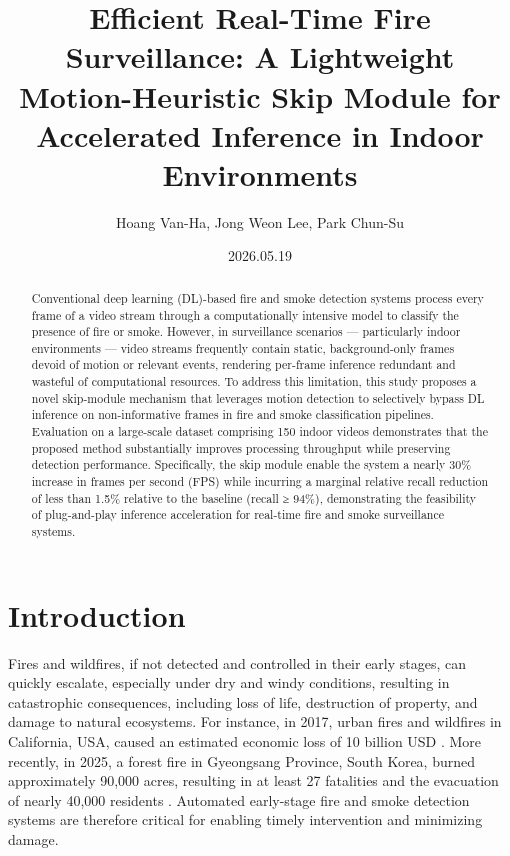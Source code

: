 \documentclass[
  10pt,
]{article}
\title{Efficient Real-Time Fire Surveillance: A Lightweight
Motion-Heuristic Skip Module for Accelerated Inference in Indoor
Environments}
\author{Hoang Van-Ha, Jong Weon Lee, Park Chun-Su}
\date{2026.05.19}
\begin{document}
\maketitle
\begin{abstract}
Conventional deep learning (DL)-based fire and smoke detection systems
process every frame of a video stream through a computationally
intensive model to classify the presence of fire or smoke. However, in
surveillance scenarios --- particularly indoor environments --- video
streams frequently contain static, background-only frames devoid of
motion or relevant events, rendering per-frame inference redundant and
wasteful of computational resources. To address this limitation, this
study proposes a novel skip-module mechanism that leverages motion
detection to selectively bypass DL inference on non-informative frames
in fire and smoke classification pipelines. Evaluation on a large-scale
dataset comprising 150 indoor videos demonstrates that the proposed
method substantially improves processing throughput while preserving
detection performance. Specifically, the skip module enable the system a
nearly 30\% increase in frames per second (FPS) while incurring a
marginal relative recall reduction of less than 1.5\% relative to the
baseline (recall ≥ 94\%), demonstrating the feasibility of plug-and-play
inference acceleration for real-time fire and smoke surveillance
systems.
\end{abstract}

\section{Introduction}\label{sec:introduction}

Fires and wildfires, if not detected and controlled in their early
stages, can quickly escalate, especially under dry and windy conditions,
resulting in catastrophic consequences, including loss of life,
destruction of property, and damage to natural ecosystems. For instance,
in 2017, urban fires and wildfires in California, USA, caused an
estimated economic loss of 10 billion USD
. More recently, in 2025, a
forest fire in Gyeongsang Province, South Korea, burned approximately
90,000 acres, resulting in at least 27 fatalities and the evacuation of
nearly 40,000 residents .
Automated early-stage fire and smoke detection systems are therefore
critical for enabling timely intervention and minimizing damage.
\end{document}
